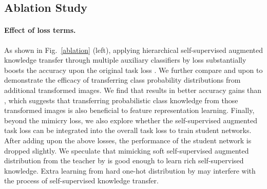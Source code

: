 \documentclass{article}
\begin{document}
\subsection{Ablation Study}
\paragraph{Effect of loss terms.} As shown in Fig.~\ref{ablation} (left), applying hierarchical self-supervised augmented knowledge transfer through multiple auxiliary classifiers by loss  substantially boosts the accuracy upon the original task loss . We further compare   and  upon  to demonstrate the efficacy of transferring class probability distributions from additional transformed images. We find that  results in better accuracy gains than , which suggests that transferring probabilistic class knowledge from those transformed images is also beneficial to feature representation learning. Finally, beyond the mimicry loss, we also explore whether the self-supervised augmented task loss  can be integrated into the overall task loss to train student networks. After adding  upon the above losses, the performance of the student network is dropped slightly. We speculate that mimicking soft self-supervised augmented distribution from the teacher by  is good enough to learn rich self-supervised knowledge. Extra learning from hard one-hot distribution by  may interfere with the process of self-supervised knowledge transfer.
\end{document}

